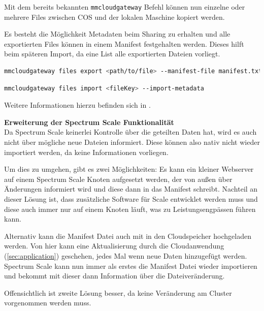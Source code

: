 Mit dem bereits bekannten \lstinline|mmcloudgateway| Befehl können nun einzelne oder mehrere Files zwischen \ac{COS} und der lokalen Maschine kopiert werden.

Es besteht die Möglichkeit Metadaten beim Sharing zu erhalten und alle exportierten Files können in einem Manifest festgehalten werden. Dieses hilft beim späteren Import, da eine List alle exportierten Dateien vorliegt. 

\begin{lstlisting}[language=bash, caption=Export von lokalen Dateien]
mmcloudgateway files export <path/to/file> --manifest-file manifest.txt --export-metadata
\end{lstlisting}

\begin{lstlisting}[language=bash, caption=Import von COS Dateien]
mmcloudgateway files import <fileKey> --import-metadata
\end{lstlisting}

Weitere Informationen hierzu befinden sich in \cite[S. 613]{scale.2017}.

\textbf{Erweiterung der Spectrum Scale Funktionalität}\\
Da Spectrum Scale keinerlei Kontrolle über die geteilten Daten hat, wird es auch nicht über mögliche neue Dateien informiert. Diese können also nativ nicht wieder importiert werden, da keine Informationen vorliegen.

Um dies zu umgehen, gibt es zwei Möglichkeiten: Es kann ein kleiner Webserver auf einem Spectrum Scale Knoten aufgesetzt werden, der von außen über Änderungen informiert wird und diese dann in das Manifest schreibt. Nachteil an dieser Lösung ist, dass zusätzliche Software für Scale entwicklet werden muss und diese auch immer nur auf einem Knoten läuft, was zu Leistungsengpässen führen kann.

Alternativ kann die Manifest Datei auch mit in den Cloudspeicher hochgeladen werden. Von hier kann eine Aktualisierung durch die Cloudanwendung (\autoref{sec:application}) geschehen, jedes Mal wenn neue Daten hinzugefügt werden. Spectrum Scale kann nun immer als erstes die Manifest Datei wieder importieren und bekommt mit dieser dann Information über die Dateiveränderung.

Offensichtlich ist zweite Lösung besser, da keine Veränderung am Cluster vorgenommen werden muss.